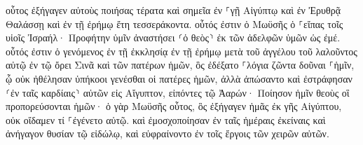 \documentclass{openreader}
\begin{document}
οὗτος ἐξήγαγεν αὐτοὺς ποιήσας τέρατα καὶ σημεῖα ἐν ⸀γῇ Αἰγύπτῳ καὶ ἐν Ἐρυθρᾷ Θαλάσσῃ καὶ ἐν τῇ ἐρήμῳ ἔτη τεσσεράκοντα. 
οὗτός ἐστιν ὁ Μωϋσῆς ὁ ⸀εἴπας τοῖς υἱοῖς Ἰσραήλ· Προφήτην ὑμῖν ἀναστήσει ⸂ὁ θεὸς⸃ ἐκ τῶν ἀδελφῶν ὑμῶν ὡς ἐμέ. 
οὗτός ἐστιν ὁ γενόμενος ἐν τῇ ἐκκλησίᾳ ἐν τῇ ἐρήμῳ μετὰ τοῦ ἀγγέλου τοῦ λαλοῦντος αὐτῷ ἐν τῷ ὄρει Σινᾶ καὶ τῶν πατέρων ἡμῶν, ὃς ἐδέξατο ⸀λόγια ζῶντα δοῦναι ⸀ἡμῖν, 
ᾧ οὐκ ἠθέλησαν ὑπήκοοι γενέσθαι οἱ πατέρες ἡμῶν, ἀλλὰ ἀπώσαντο καὶ ἐστράφησαν ⸂ἐν ταῖς καρδίαις⸃ αὐτῶν εἰς Αἴγυπτον, 
εἰπόντες τῷ Ἀαρών· Ποίησον ἡμῖν θεοὺς οἳ προπορεύσονται ἡμῶν· ὁ γὰρ Μωϋσῆς οὗτος, ὃς ἐξήγαγεν ἡμᾶς ἐκ γῆς Αἰγύπτου, οὐκ οἴδαμεν τί ⸀ἐγένετο αὐτῷ. 
καὶ ἐμοσχοποίησαν ἐν ταῖς ἡμέραις ἐκείναις καὶ ἀνήγαγον θυσίαν τῷ εἰδώλῳ, καὶ εὐφραίνοντο ἐν τοῖς ἔργοις τῶν χειρῶν αὐτῶν. 
\end{document}
